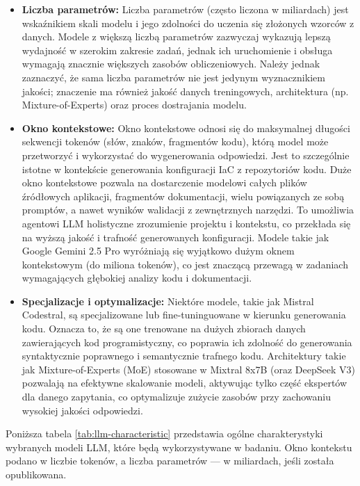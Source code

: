 \begin{itemize}
    \item \textbf{Liczba parametrów:} Liczba parametrów (często liczona w miliardach) jest wskaźnikiem skali modelu i jego zdolności do uczenia się złożonych wzorców z danych. Modele z większą liczbą parametrów zazwyczaj wykazują lepszą wydajność w szerokim zakresie zadań, jednak ich uruchomienie i obsługa wymagają znacznie większych zasobów obliczeniowych. Należy jednak zaznaczyć, że sama liczba parametrów nie jest jedynym wyznacznikiem jakości; znaczenie ma również jakość danych treningowych, architektura (np. Mixture-of-Experts) oraz proces dostrajania modelu.
    \item \textbf{Okno kontekstowe:} Okno kontekstowe odnosi się do maksymalnej długości sekwencji tokenów (słów, znaków, fragmentów kodu), którą model może przetworzyć i wykorzystać do wygenerowania odpowiedzi. Jest to szczególnie istotne w kontekście generowania konfiguracji IaC z repozytoriów kodu. Duże okno kontekstowe pozwala na dostarczenie modelowi całych plików źródłowych aplikacji, fragmentów dokumentacji, wielu powiązanych ze sobą promptów, a nawet wyników walidacji z zewnętrznych narzędzi. To umożliwia agentowi LLM holistyczne zrozumienie projektu i kontekstu, co przekłada się na wyższą jakość i trafność generowanych konfiguracji. Modele takie jak Google Gemini 2.5 Pro wyróżniają się wyjątkowo dużym oknem kontekstowym (do miliona tokenów), co jest znaczącą przewagą w zadaniach wymagających głębokiej analizy kodu i dokumentacji.
    \item \textbf{Specjalizacje i optymalizacje:} Niektóre modele, takie jak Mistral Codestral, są specjalizowane lub fine-tuninguowane w kierunku generowania kodu. Oznacza to, że są one trenowane na dużych zbiorach danych zawierających kod programistyczny, co poprawia ich zdolność do generowania syntaktycznie poprawnego i semantycznie trafnego kodu. Architektury takie jak Mixture-of-Experts (MoE) stosowane w Mixtral 8x7B (oraz DeepSeek V3) pozwalają na efektywne skalowanie modeli, aktywując tylko część ekspertów dla danego zapytania, co optymalizuje zużycie zasobów przy zachowaniu wysokiej jakości odpowiedzi.
\end{itemize}

Poniższa tabela \ref{tab:llm-characteristic} przedstawia ogólne charakterystyki wybranych modeli LLM, które będą wykorzystywane w badaniu. Okno kontekstu podano w liczbie tokenów, a liczba parametrów — w miliardach, jeśli została opublikowana.

\newpage %

